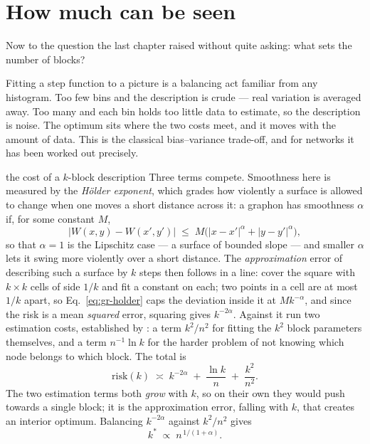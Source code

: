 \section{How much can be seen}

Now to the question the last chapter raised without quite asking: what sets the
number of blocks?

Fitting a step function to a picture is a balancing act familiar from any
histogram. Too few bins and the description is crude --- real variation is
averaged away. Too many and each bin holds too little data to estimate, so the
description is noise. The optimum sits where the two costs meet, and it moves
with the amount of data. This is the classical bias--variance trade-off, and for
networks it has been worked out precisely.

\begin{calculation}{the cost of a $k$-block description}
Three terms compete. Smoothness here is measured by the \emph{H\"older
exponent}, which grades how violently a surface is allowed to change when one
moves a short distance across it: a graphon has smoothness $\alpha$ if, for some
constant $M$,
\begin{equation}
  |W(x,y)-W(x',y')| \;\le\; M\big(|x-x'|^{\alpha}+|y-y'|^{\alpha}\big),
  \label{eq:gr-holder}
\end{equation}
so that $\alpha=1$ is the Lipschitz case --- a surface of bounded slope --- and
smaller $\alpha$ lets it swing more violently over a short distance. The
\emph{approximation} error of describing such a surface by $k$ steps then follows
in a line: cover the square with $k\times k$ cells of side $1/k$ and fit a constant
on each; two points in a cell are at most $1/k$ apart, so
Eq.~\eqref{eq:gr-holder} caps the deviation inside it at $Mk^{-\alpha}$, and since
the risk is a mean \emph{squared} error, squaring gives $k^{-2\alpha}$. Against it
run two estimation costs, established by
\citet{gao2015}: a term $k^2/n^2$ for fitting the $k^2$ block parameters
themselves, and a term $n^{-1}\ln k$ for the harder problem of not knowing which
node belongs to which block. The total is
\begin{equation}
  \mathrm{risk}(k) \;\asymp\; k^{-2\alpha} \;+\; \frac{\ln k}{n} \;+\; \frac{k^2}{n^2}.
  \label{eq:gr-risk}
\end{equation}
The two estimation terms both \emph{grow} with $k$, so on their own they would
push towards a single block; it is the approximation error, falling with $k$, that
creates an interior optimum. Balancing $k^{-2\alpha}$ against $k^2/n^2$ gives
\begin{equation}
  k^* \;\propto\; n^{\,1/(1+\alpha)} .
  \label{eq:gr-kstar}
\end{equation}
\end{calculation}

